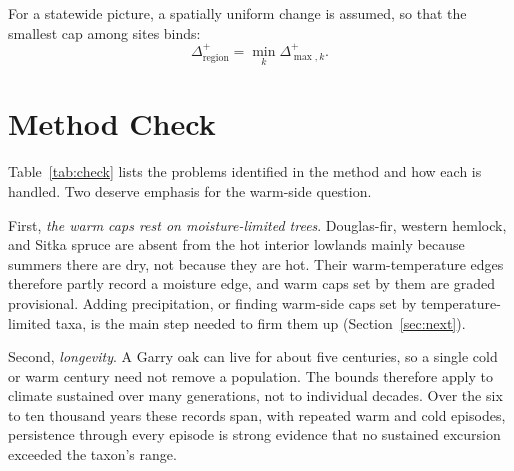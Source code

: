 \documentclass[11pt]{article}
\begin{document}
For a statewide picture, a spatially uniform change is assumed, so that the smallest cap among sites binds:
\begin{equation}
\Delta^{+}_{\text{region}} = \min_{k} \Delta^{+}_{\max,k}.
\label{eq:region}
\end{equation}

\section{Method Check}\label{sec:check}

Table~\ref{tab:check} lists the problems identified in the method and how each is handled. Two deserve emphasis for the warm-side question.

First, \emph{the warm caps rest on moisture-limited trees}. Douglas-fir, western hemlock, and Sitka spruce are absent from the hot interior lowlands mainly because summers there are dry, not because they are hot. Their warm-temperature edges therefore partly record a moisture edge, and warm caps set by them are graded provisional. Adding precipitation, or finding warm-side caps set by temperature-limited taxa, is the main step needed to firm them up (Section~\ref{sec:next}).

Second, \emph{longevity}. A Garry oak can live for about five centuries, so a single cold or warm century need not remove a population. The bounds therefore apply to climate sustained over many generations, not to individual decades. Over the six to ten thousand years these records span, with repeated warm and cold episodes, persistence through every episode is strong evidence that no sustained excursion exceeded the taxon's range.
\end{document}
